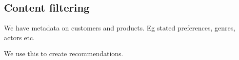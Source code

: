 
\subsection{Content filtering}

We have metadata on customers and products. Eg stated preferences, genres, actors etc.

We use this to create recommendations.

